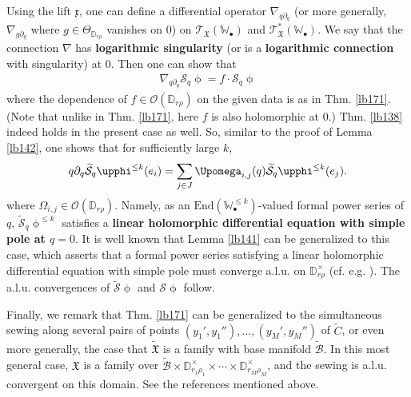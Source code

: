 \documentclass[11pt,b5paper,notitlepage]{article}
\theoremstyle{definition}
\theoremstyle{plain}
\newcommand{\fk}{\mathfrak}
\newcommand{\mc}{\mathcal}
\newcommand{\wtd}{\widetilde}
\newcommand{\End}{\mathrm{End}} %
\newcommand{\scr}{\mathscr}
\newcommand{\xk}{\mathfrak x}
\newcommand{\blt}{\bullet}
\newcommand{\Wbb}{\mathbb W}
\newcommand{\Dbb}{\mathbb D}
\numberwithin{equation}{section}
\begin{document}
Using the lift $\xk$, one can define a differential operator $\nabla_{q\partial_q}$ (or more generally, $\nabla_{g\partial_q}$ where $g\in\Theta_{\Dbb_{r\rho}}$ vanishes on $0$) on $\scr T_{\fk X}(\Wbb_\blt)$ and $\scr T_{\fk X}^*(\Wbb_\blt)$. We say that the connection $\nabla$ has \textbf{logarithmic singularity} (or is a \textbf{logarithmic connection} with singularity) at $0$. Then one can show  that
\begin{align}
\nabla_{q\partial_q}\mc S_q\upphi=f\cdot\mc S_q\upphi
\end{align}
where the dependence of $f\in\scr O(\Dbb_{r\rho})$ on the given data is as in Thm. \ref{lb171}. (Note that unlike in Thm. \ref{lb171},  here $f$ is also holomorphic at $0$.) Thm. \ref{lb138} indeed holds in the present case as well. So, similar to the proof of Lemma \ref{lb142}, one shows that for sufficiently large $k$,
\begin{align}
q\partial_q\wtd{\mc S}_q\upphi^{\leq k}(e_i)=\sum_{j\in J}\Upomega_{i,j}(q)\wtd{\mc S}_q\upphi^{\leq k}(e_j).\label{eq253}
\end{align}
where $\Omega_{i,j}\in\scr O(\Dbb_{r\rho})$. Namely, as an $\End(\Wbb_\blt^{\leq k})$-valued formal power series of $q$, $\wtd{\mc S}_q\upphi^{\leq k}$ satisfies a \textbf{linear holomorphic differential equation with simple pole at $q=0$}. It is well known that Lemma \ref{lb141} can be generalized to this case, which asserts that a formal power series satisfying a linear holomorphic differential equation with simple pole must converge a.l.u. on $\Dbb_{r\rho}^\times$ (cf. e.g. \cite[Sec. 1.7]{Gui}). The a.l.u. convergences of $\wtd{\mc S}\upphi$ and $\mc S\upphi$ follow. 

Finally, we remark that Thm. \ref{lb171} can be generalized to the simultaneous sewing along several pairs of points $(y_1',y_1''),\dots,(y_M',y_M'')$ of $\wtd C$, or even more generally, the case that $\wtd {\fk X}$ is a family with base manifold $\wtd{\mc B}$. In this most general case, $\fk X$ is a family over $\wtd{\mc B}\times\Dbb^\times_{r_1\rho_1}\times\cdots\times\Dbb^\times_{r_M\rho_M}$, and the sewing is a.l.u. convergent on this domain. See the references mentioned above.




\subsection{}
\end{document}
